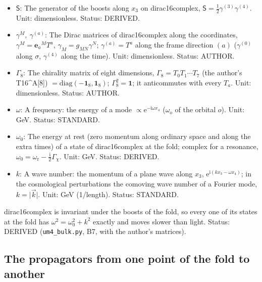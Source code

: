 \documentclass[
  10pt,
]{article}
\providecommand{\tightlist}{%
  \setlength{\itemsep}{0pt}\setlength{\parskip}{0pt}}
\begin{document}
\begin{itemize}
\tightlist
\item
  \(\mathsf{S}\): The generator of the boosts along \(x_3\) on
  dirac16complex, \(\mathsf{S} = \frac12\gamma^{(3)}\gamma^{(4)}\).
  Unit: dimensionless. Status: DERIVED.
\item
  \(\gamma^M,\ \gamma^{(a)}\): The Dirac matrices of dirac16complex
  along the coordinates, \(\gamma^M = \mathbf{e}_a{}^MT^a\),
  \(\gamma_M = g_{MN}\gamma^N\); \(\gamma^{(a)} = T^a\) along the frame
  direction \((a)\) (\(\gamma^{(0)}\) along \(\sigma\), \(\gamma^{(4)}\)
  along the time). Unit: dimensionless. Status: AUTHOR.
\item
  \(\Gamma_8\): The chirality matrix of eight dimensions,
  \(\Gamma_8 = T_0T_1\cdots T_7\) (the author's T16\^{}A{[}8{]})
  \(= \mathrm{diag}(-\mathbf{1}_8, \mathbf{1}_8)\);
  \(\Gamma_8^2 = \mathbf{1}\); it anticommutes with every \(T_a\). Unit:
  dimensionless. Status: AUTHOR.
\item
  \(\omega\): A frequency: the energy of a mode
  \(\propto \mathrm{e}^{-\mathrm{i}\omega x_4}\) (\(\omega_o\) of the
  orbital \(o\)). Unit: GeV. Status: STANDARD.
\item
  \(\omega_0\): The energy at rest (zero momentum along ordinary space
  and along the extra times) of a state of dirac16complex at the fold;
  complex for a resonance,
  \(\omega_0 = \omega_{\mathrm{r}} - \frac{\mathrm{i}}{2}\Gamma_\chi\).
  Unit: GeV. Status: DERIVED.
\item
  \(k\): A wave number: the momentum of a plane wave along \(x_3\),
  \(\mathrm{e}^{\mathrm{i}(kx_3 - \omega x_4)}\); in the cosmological
  perturbations the comoving wave number of a Fourier mode,
  \(k = \lvert\vec k\rvert\). Unit: GeV (1/length). Status: STANDARD.
\end{itemize}

dirac16complex is invariant under the boosts of the fold, so every one
of its states at the fold has \(\omega^2 = \omega_0^2 + k^2\) exactly
and moves slower than light. Status: DERIVED (\texttt{um4\_bulk.py}, B7,
with the author's matrices).

\hypertarget{the-propagators-from-one-point-of-the-fold-to-another}{%
\subsection{The propagators from one point of the fold to
another}\label{the-propagators-from-one-point-of-the-fold-to-another}}
\end{document}
